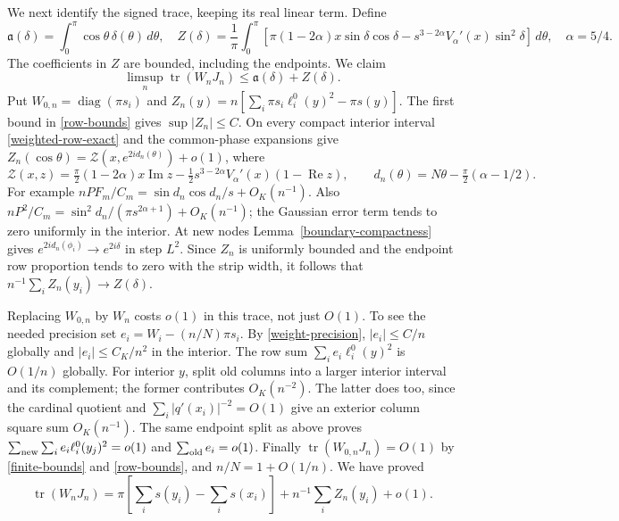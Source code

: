 \documentclass[a4paper,11pt]{amsart}
\theoremstyle{remark}\newtheorem{remark}[theorem]{Remark}
\newcommand{\tr}{\operatorname{tr}}
\newcommand{\diag}{\operatorname{diag}}
\newcommand{\dd}{\,d}
\begin{document}
We next identify the signed trace, keeping its real linear term.
Define
\begin{equation}\label{signed-functionals}
 \mathfrak a(\delta)=\int_0^\pi\cos\theta\,\delta(\theta)\dd\theta,
 \quad Z(\delta)=\frac1\pi\int_0^\pi
 [\pi(1-2\alpha)x\sin\delta\cos\delta
 -s^{3-2\alpha}V_\alpha'(x)\sin^2\delta]\dd\theta,
 \quad \alpha=5/4.
\end{equation}
The coefficients in $Z$ are bounded, including the endpoints.
We claim
\begin{equation}\label{signed-limit}
 \limsup_n\tr(W_nJ_n)\le\mathfrak a(\delta)+Z(\delta).
\end{equation}
Put $W_{0,n}=\diag(\pi s_i)$ and
$Z_n(y)=n[\sum_i\pi s_i\ell_i^0(y)^2-\pi s(y)]$.
The first bound in \eqref{row-bounds} gives $\sup|Z_n|\le C$.
On every compact interior interval \eqref{weighted-row-exact}
and the common-phase expansions give
$Z_n(\cos\theta)=\mathcal Z(x,e^{2id_n(\theta)})+o(1)$, where
\begin{equation}\label{Z-kernel}
 \mathcal Z(x,z)=\tfrac\pi2(1-2\alpha)x\operatorname{Im}z
 -\tfrac12s^{3-2\alpha}V_\alpha'(x)(1-\operatorname{Re}z),
 \qquad d_n(\theta)=N\theta-\tfrac\pi2(\alpha-1/2).
\end{equation}
For example $nPF_m/C_m=\sin d_n\cos d_n/s+O_K(n^{-1})$.
Also $nP^2/C_m=\sin^2d_n/(\pi s^{2\alpha+1})+O_K(n^{-1})$;
the Gaussian error term tends to zero uniformly in the interior.
At new nodes Lemma~\ref{boundary-compactness} gives
$e^{2id_n(\phi_i)}\to e^{2i\delta}$ in step $L^2$.
Since $Z_n$ is uniformly bounded and the endpoint row proportion
tends to zero with the strip width, it follows that
$n^{-1}\sum_iZ_n(y_i)\to Z(\delta)$.

Replacing $W_{0,n}$ by $W_n$ costs $o(1)$ in this trace, not just
$O(1)$. To see the needed precision set
$e_i=W_i-(n/N)\pi s_i$. By \eqref{weight-precision},
$|e_i|\le C/n$ globally and $|e_i|\le C_K/n^2$ in the interior.
The row sum $\sum_i e_i\ell_i^0(y)^2$ is $O(1/n)$ globally.
For interior $y$, split old columns into a larger interior interval
and its complement; the former contributes $O_K(n^{-2})$.
The latter does too, since the cardinal quotient and
$\sum_i|q'(x_i)|^{-2}=O(1)$ give an exterior column square sum
$O_K(n^{-1})$. The same endpoint split as above proves
$\sum_{\rm new}\sum_i e_i\ell_i^0(y_j)^2=o(1)$ and
$\sum_{\rm old}e_i=o(1)$.
Finally $\tr(W_{0,n}J_n)=O(1)$ by \eqref{finite-bounds} and
\eqref{row-bounds}, and $n/N=1+O(1/n)$. We have proved
\begin{equation}\label{signed-split}
 \tr(W_nJ_n)=\pi\left[\sum_i s(y_i)-\sum_i s(x_i)\right]
 +n^{-1}\sum_i Z_n(y_i)+o(1).
\end{equation}
\end{document}
